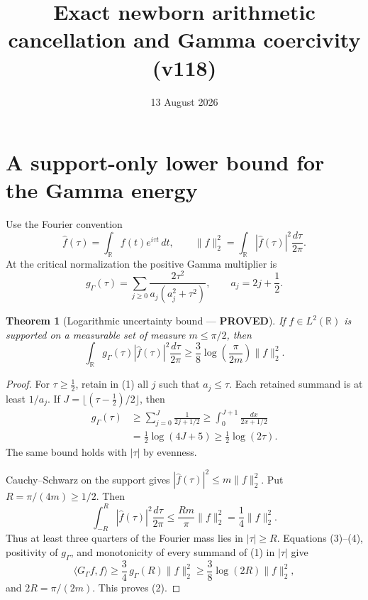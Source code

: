 \documentclass[11pt]{article}
\title{Exact newborn arithmetic cancellation and Gamma coercivity (v118)}
\date{13 August 2026}
\newcommand{\PROVED}{\textcolor{green!40!black}{\textbf{PROVED}}}
\newtheorem{theorem}{Theorem}
\begin{document}
\maketitle

\section{A support-only lower bound for the Gamma energy}

Use the Fourier convention
\[
 \widehat f(\tau)=\int_{\mathbb R}f(t)e^{i\tau t}\,dt,
 \qquad
 \|f\|_2^2=\int_{\mathbb R}|\widehat f(\tau)|^2\frac{d\tau}{2\pi}.
\]
At the critical normalization the positive Gamma multiplier is
\begin{equation}
 g_\Gamma(\tau)=\sum_{j\ge0}
 \frac{2\tau^2}{a_j(a_j^2+\tau^2)},
 \qquad a_j=2j+\frac12.                                     \tag{1}
\end{equation}

\begin{theorem}[Logarithmic uncertainty bound --- \PROVED]
If $f\in L^2(\mathbb R)$ is supported on a measurable set of measure
$m\le\pi/2$, then
\begin{equation}
 \boxed{
 \int_{\mathbb R}g_\Gamma(\tau)|\widehat f(\tau)|^2
                 \frac{d\tau}{2\pi}
 \ge \frac38\log\!\left(\frac{\pi}{2m}\right)\|f\|_2^2.} \tag{2}
\end{equation}
\end{theorem}

\begin{proof}
For $\tau\ge\tfrac12$, retain in (1) all $j$ such that $a_j\le\tau$.
Each retained summand is at least $1/a_j$.  If
$J=\lfloor(\tau-\frac12)/2\rfloor$, then
\begin{align*}
 g_\Gamma(\tau)
 &\ge\sum_{j=0}^J\frac1{2j+1/2}
 \ge\int_0^{J+1}\frac{dx}{2x+1/2}\\
 &=\frac12\log(4J+5)
 \ge\frac12\log(2\tau).                                   \tag{3}
\end{align*}
The same bound holds with $|\tau|$ by evenness.

Cauchy--Schwarz on the support gives
$|\widehat f(\tau)|^2\le m\|f\|_2^2$.  Put
$R=\pi/(4m)\ge1/2$.  Then
\begin{equation}
 \int_{-R}^R|\widehat f(\tau)|^2\frac{d\tau}{2\pi}
 \le\frac{Rm}{\pi}\|f\|_2^2
 =\frac14\|f\|_2^2.                                       \tag{4}
\end{equation}
Thus at least three quarters of the Fourier mass lies in $|\tau|\ge R$.
Equations (3)--(4), positivity of $g_\Gamma$, and monotonicity of every
summand of (1) in $|\tau|$ give
\[
 \langle G_\Gamma f,f\rangle
 \ge\frac34\,g_\Gamma(R)\|f\|_2^2
 \ge\frac38\log(2R)\|f\|_2^2,
\]
and $2R=\pi/(2m)$.  This proves (2).
\end{proof}
\end{document}
